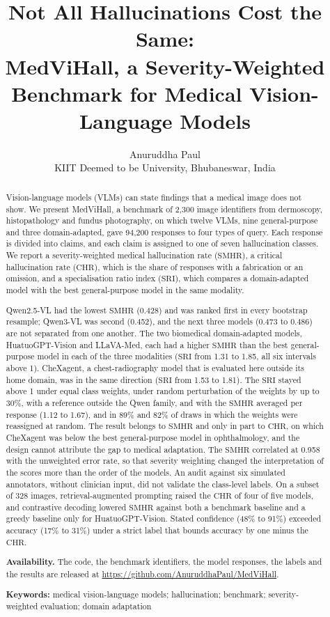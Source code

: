 \documentclass[11pt,a4paper]{article}
\title{Not All Hallucinations Cost the Same:\\
       \large MedViHall, a Severity-Weighted Benchmark for Medical Vision-Language Models}
\author{Anuruddha Paul\\ \small KIIT Deemed to be University, Bhubaneswar, India}
\date{}
\providecommand{\Nimages}{2{,}300}
\providecommand{\Nresponses}{94{,}200}
\newcommand{\SMHR}{\ensuremath{\mathrm{SMHR}}}
\newcommand{\CHR}{\ensuremath{\mathrm{CHR}}}
\newcommand{\SRI}{\ensuremath{\mathrm{SRI}}}
\begin{document}
\maketitle
\begin{abstract}
Vision-language models (VLMs) can state findings that a medical image does not show. We present MedViHall, a benchmark of \Nimages{} image identifiers from dermoscopy, histopathology and fundus photography, on which twelve VLMs, nine general-purpose and three domain-adapted, gave \Nresponses{} responses to four types of query. Each response is divided into claims, and each claim is assigned to one of seven hallucination classes. We report a severity-weighted medical hallucination rate (\SMHR{}), a critical hallucination rate (\CHR{}), which is the share of responses with a fabrication or an omission, and a specialisation ratio index (\SRI{}), which compares a domain-adapted model with the best general-purpose model in the same modality.

Qwen2.5-VL had the lowest \SMHR{} (0.428) and was ranked first in every bootstrap resample; Qwen3-VL was second (0.452), and the next three models (0.473 to 0.486) are not separated from one another. The two biomedical domain-adapted models, HuatuoGPT-Vision and LLaVA-Med, each had a higher \SMHR{} than the best general-purpose model in each of the three modalities (\SRI{} from 1.31 to 1.85, all six intervals above 1). CheXagent, a chest-radiography model that is evaluated here outside its home domain, was in the same direction (\SRI{} from 1.53 to 1.81). The \SRI{} stayed above 1 under equal class weights, under random perturbation of the weights by up to 30\%, with a reference outside the Qwen family, and with the \SMHR{} averaged per response (1.12 to 1.67), and in 89\% and 82\% of draws in which the weights were reassigned at random. The result belongs to \SMHR{} and only in part to \CHR{}, on which CheXagent was below the best general-purpose model in ophthalmology, and the design cannot attribute the gap to medical adaptation. The \SMHR{} correlated at 0.958 with the unweighted error rate, so that severity weighting changed the interpretation of the scores more than the order of the models. An audit against six simulated annotators, without clinician input, did not validate the class-level labels. On a subset of 328 images, retrieval-augmented prompting raised the \CHR{} of four of five models, and contrastive decoding lowered \SMHR{} against both a benchmark baseline and a greedy baseline only for HuatuoGPT-Vision. Stated confidence (48\% to 91\%) exceeded accuracy (17\% to 31\%) under a strict label that bounds accuracy by one minus the \CHR{}.




\noindent\textbf{Availability.} The code, the benchmark identifiers, the model responses, the labels and the results are released at \url{https://github.com/AnuruddhaPaul/MedViHall}.

\medskip
\noindent\textbf{Keywords:} medical vision-language models; hallucination; benchmark; severity-weighted evaluation; domain adaptation
\end{abstract}
\end{document}
